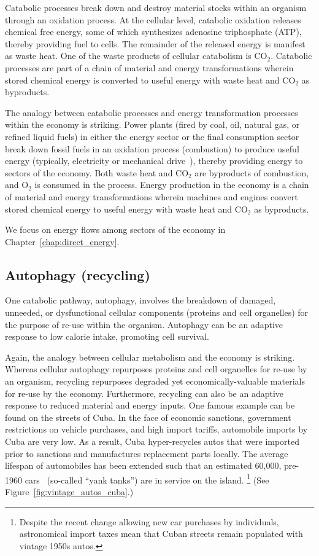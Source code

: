 Catabolic processes break down and destroy material stocks within an organism
through an oxidation process.
At the cellular level, catabolic oxidation releases chemical free energy, 
some of which synthesizes adenosine triphosphate (ATP), 
thereby providing fuel to cells. 
The remainder of the released energy is manifest as waste heat.
One of the waste products of cellular catabolism is CO$_2$.
Catabolic processes are part of a chain of material and energy transformations
wherein stored chemical energy is converted to useful energy
with waste heat and CO$_2$ as byproducts.

The analogy between catabolic processes and energy transformation processes
within the economy is striking.
Power plants (fired by coal, oil, natural gas, or refined liquid fuels) 
in either the energy sector or the final consumption sector
break down fossil fuels
in an oxidation process (combustion) to produce useful energy 
(typically, electricity or mechanical drive~\cite{Ayres:2010ug}), 
thereby providing energy to sectors of the economy.
Both waste heat and CO$_2$ are byproducts of combustion, 
and O$_2$ is consumed in the process.
Energy production in the economy is a chain of material and energy transformations 
wherein machines and engines 
convert stored chemical energy to useful energy
with waste heat and CO$_2$ as byproducts.

We focus on energy flows among sectors of the economy
in Chapter~\ref{chap:direct_energy}.


\subsection{Autophagy (recycling)}
\label{sec:autophagy}

One catabolic pathway, autophagy, 
involves the breakdown of damaged, unneeded, or dysfunctional cellular components 
(proteins and cell organelles)
for the purpose of re-use within the organism. 
Autophagy can be an adaptive response to low calorie intake,
promoting cell survival.

Again, the analogy between cellular metabolism and the economy is striking.
Whereas cellular autophagy repurposes proteins and cell organelles
for re-use by an organism,
recycling repurposes degraded
yet economically-valuable materials
for re-use by the economy.
Furthermore, recycling can also be an adaptive response 
to reduced material and energy inputs.
One famous example can be found on the streets of Cuba.
In the face of economic sanctions,
government restrictions on vehicle purchases, and
high import tariffs,
automobile imports by Cuba are very low.
As a result, Cuba hyper-recycles autos that were imported
prior to sanctions and manufactures replacement parts locally.
The average lifespan of automobiles has been extended
such that an estimated 60,000, pre-1960 cars~\cite{Schweid:2004aa} 
(so-called ``yank tanks'') are in service on the island.%
	\footnote{Despite the recent change allowing new car purchases by individuals,
	astronomical import taxes mean that Cuban streets remain populated 
	with vintage 1950s autos.\cite{Ramey:2014aa}
	}
(See Figure~\ref{fig:vintage_autos_cuba}.)

